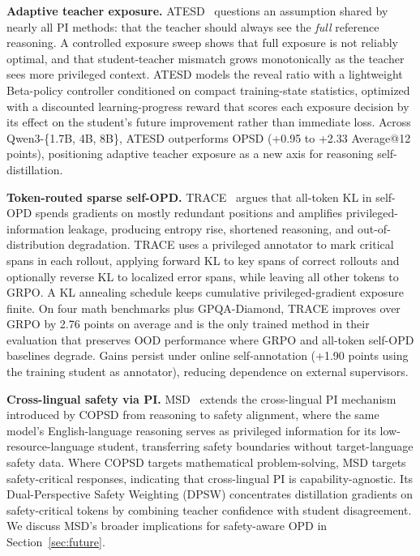 \documentclass{article} %
\begin{document}
\textbf{Adaptive teacher exposure.} ATESD~\citep{2605.11458} questions an assumption shared by nearly all PI methods: that the teacher should always see the \emph{full} reference reasoning. A controlled exposure sweep shows that full exposure is not reliably optimal, and that student-teacher mismatch grows monotonically as the teacher sees more privileged context. ATESD models the reveal ratio with a lightweight Beta-policy controller conditioned on compact training-state statistics, optimized with a discounted learning-progress reward that scores each exposure decision by its effect on the student's future improvement rather than immediate loss. Across Qwen3-\{1.7B, 4B, 8B\}, ATESD outperforms OPSD (+0.95 to +2.33 Average@12 points), positioning adaptive teacher exposure as a new axis for reasoning self-distillation.

\textbf{Token-routed sparse self-OPD.} TRACE~\citep{2605.10194} argues that all-token KL in self-OPD spends gradients on mostly redundant positions and amplifies privileged-information leakage, producing entropy rise, shortened reasoning, and out-of-distribution degradation. TRACE uses a privileged annotator to mark critical spans in each rollout, applying forward KL to key spans of correct rollouts and optionally reverse KL to localized error spans, while leaving all other tokens to GRPO. A KL annealing schedule keeps cumulative privileged-gradient exposure finite. On four math benchmarks plus GPQA-Diamond, TRACE improves over GRPO by 2.76 points on average and is the only trained method in their evaluation that preserves OOD performance where GRPO and all-token self-OPD baselines degrade. Gains persist under online self-annotation (+1.90 points using the training student as annotator), reducing dependence on external supervisors.

\textbf{Cross-lingual safety via PI.} MSD~\citep{2605.02971} extends the cross-lingual PI mechanism introduced by COPSD from reasoning to safety alignment, where the same model's English-language reasoning serves as privileged information for its low-resource-language student, transferring safety boundaries without target-language safety data. Where COPSD targets mathematical problem-solving, MSD targets safety-critical responses, indicating that cross-lingual PI is capability-agnostic. Its Dual-Perspective Safety Weighting (DPSW) concentrates distillation gradients on safety-critical tokens by combining teacher confidence with student disagreement. We discuss MSD's broader implications for safety-aware OPD in Section~\ref{sec:future}.
\end{document}
